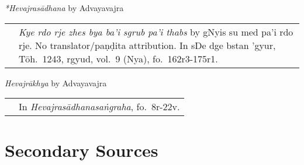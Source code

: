 \documentclass[12pt,twoside]{article}
\begin{document}
\noindent\emph{*Hevajrasādhana} by Advayavajra
\noindent\begin{longtable}{ p{} p{} }
	& \emph{Kye rdo rje zhes bya ba'i sgrub pa'i thabs} by gNyis su med pa'i rdo rje. No translator/paṇḍita attribution.  In sDe dge bstan 'gyur, Tōh.\ 1243, rgyud, vol.\ 9 (Nya), fo.\ 162r3-175r1. 
\end{longtable}

\noindent\emph{Hevajrākhya} by Advayavajra
\noindent\begin{longtable}{ p{} p{} }
	& In \emph{Hevajrasādhanasaṅgraha}, fo.\ 8r-22v.
\end{longtable}

	\section*{Secondary Sources}
	\printbibliography[notcategory=fullcited,resetnumbers,heading=none]
\end{document}
